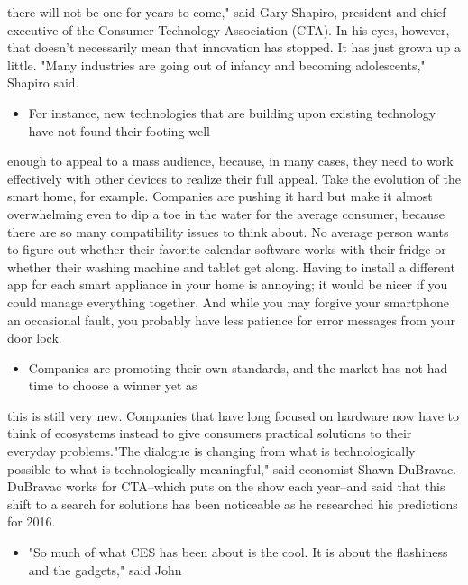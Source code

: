 \documentclass[UTF8,11pt]{ctexart}
\begin{document}
there will not be one for years to come," said Gary Shapiro, president and chief executive of the Consumer Technology Association (CTA). In his eyes, however, that doesn't necessarily mean that innovation has stopped. It has just grown up a little. "Many industries are going out of infancy and becoming adolescents," Shapiro said.


\begin{itemize}[leftmargin=2em,itemsep=.2em,topsep=.4em]\item[D.] For instance, new technologies that are building upon existing technology have not found their footing well
\end{itemize}

enough to appeal to a mass audience, because, in many cases, they need to work effectively with other devices to realize their full appeal. Take the evolution of the smart home, for example. Companies are pushing it hard but make it almost overwhelming even to dip a toe in the water for the average consumer, because there are so many compatibility issues to think about. No average person wants to figure out whether their favorite calendar software works with their fridge or whether their washing machine and tablet get along. Having to install a different app for each smart appliance in your home is annoying; it would be nicer if you could manage everything together. And while you may forgive your smartphone an occasional fault, you probably have less patience for error messages from your door lock.


\begin{itemize}[leftmargin=2em,itemsep=.2em,topsep=.4em]\item[E.] Companies are promoting their own standards, and the market has not had time to choose a winner yet as
\end{itemize}

this is still very new. Companies that have long focused on hardware now have to think of ecosystems instead to give consumers practical solutions to their everyday problems."The dialogue is changing from what is technologically possible to what is technologically meaningful," said economist Shawn DuBravac. DuBravac works for CTA--which puts on the show each year--and said that this shift to a search for solutions has been noticeable as he researched his predictions for 2016.


\begin{itemize}[leftmargin=2em,itemsep=.2em,topsep=.4em]\item[F.] "So much of what CES has been about is the cool. It is about the flashiness and the gadgets," said John
\end{itemize}
\end{document}
